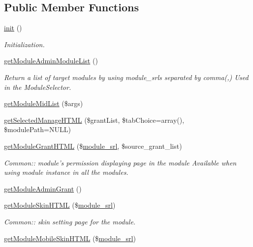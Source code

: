 \subsection*{Public Member Functions}
\begin{DoxyCompactItemize}
\item 
\hyperlink{classmoduleAdminModel_ad12d0ad0d64fc00df2ffef5d95446ff9}{init} ()
\begin{DoxyCompactList}\small\item\em Initialization. \end{DoxyCompactList}\item 
\hyperlink{classmoduleAdminModel_ab87a76519a343b50db20d17983b4d2c7}{get\-Module\-Admin\-Module\-List} ()
\begin{DoxyCompactList}\small\item\em Return a list of target modules by using module\-\_\-srls separated by comma(,) Used in the Module\-Selector. \end{DoxyCompactList}\item 
\hyperlink{classmoduleAdminModel_af1e58f7c102a8ee238f25ff2b193e6d7}{get\-Module\-Mid\-List} (\$args)
\item 
\hyperlink{classmoduleAdminModel_ada2b0f866658526c7cf2bb5876b0c087}{get\-Selected\-Manage\-H\-T\-M\-L} (\$grant\-List, \$tab\-Choice=array(), \$module\-Path=N\-U\-L\-L)
\item 
\hyperlink{classmoduleAdminModel_a0ab602897fb53096f7b232338c533839}{get\-Module\-Grant\-H\-T\-M\-L} (\$\hyperlink{ko_8install_8php_a370bb6450fab1da3e0ed9f484a38b761}{module\-\_\-srl}, \$source\-\_\-grant\-\_\-list)
\begin{DoxyCompactList}\small\item\em Common\-:\-: module's permission displaying page in the module Available when using module instance in all the modules. \end{DoxyCompactList}\item 
\hyperlink{classmoduleAdminModel_a84f8431365473f8ddb70cb9cc1976db1}{get\-Module\-Admin\-Grant} ()
\item 
\hyperlink{classmoduleAdminModel_a7d52af7d5e35ad9ea0749a550e28e483}{get\-Module\-Skin\-H\-T\-M\-L} (\$\hyperlink{ko_8install_8php_a370bb6450fab1da3e0ed9f484a38b761}{module\-\_\-srl})
\begin{DoxyCompactList}\small\item\em Common\-:\-: skin setting page for the module. \end{DoxyCompactList}\item 
\hyperlink{classmoduleAdminModel_a38c85d9c28facff15f1c54ebe1e5b70b}{get\-Module\-Mobile\-Skin\-H\-T\-M\-L} (\$\hyperlink{ko_8install_8php_a370bb6450fab1da3e0ed9f484a38b761}{module\-\_\-srl})

\end{DoxyCompactItemize}
